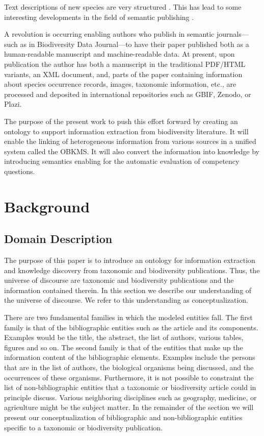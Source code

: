 \documentclass{bmcart}
\def\VIKTOR#1{\medskip\par\noindent\textcolor{blue}{\bf VIKTOR: #1}\par\medskip}
\def\KIRIL#1{\medskip\par\noindent\textcolor{red}{\bf KIRIL: #1}\par\medskip}
\begin{document}
Text descriptions of new species are very structured \cite{}. This has lead to some interesting developments in the field of semantic publishing  \cite{}. 

A revolution is occurring enabling authors who publish in semantic journals---such as in Biodiversity Data Journal---to have their paper published both as a human-readable manuscript and machine-readable data. At present, upon publication the author has both a manuscript in the traditional PDF/HTML variants, an XML document, and, parts of the paper containing information about species occurrence records, images, taxonomic information, etc., are processed and deposited in international repositories such as GBIF, Zenodo, or Plazi.

The purpose of the present work to push this effort forward by creating an ontology to support information extraction from biodiversity literature. It will enable the linking of heterogeneous information from various sources in a unified system called the OBKMS. It will also convert the information into knowledge by introducing semantics enabling for the automatic evaluation of competency questions.

\section{Background}

\subsection{Domain Description}



The purpose of this paper is to introduce an ontology for information extraction and knowledge discovery from taxonomic and biodiversity publications. Thus, the universe of discourse are taxonomic and biodiversity publications and the information contained therein. In this section we describe our understanding of the universe of discourse. We refer to this understanding as conceptualization.

There are two fundamental families in which the modeled entities fall. The first family is that of the bibliographic entities such as the article and its components. Examples would be the title, the abstract, the list of authors, various tables, figures and so on. The second family is that of the entities that make up the information content of the bibliographic elements. Examples include the persons that are in the list of authors, the biological organisms being discussed, and the occurrences of these organisms. Furthermore, it is not possible to constraint the list of non-bibliographic entities that a taxonomic or biodiversity article could in principle discuss. Various neighboring disciplines such as geography, medicine, or agriculture might be the subject matter. In the remainder of the section we will present our conceptualization of bibliographic and non-bibliographic entities specific to a taxonomic or biodiversity publication.
\end{document}
